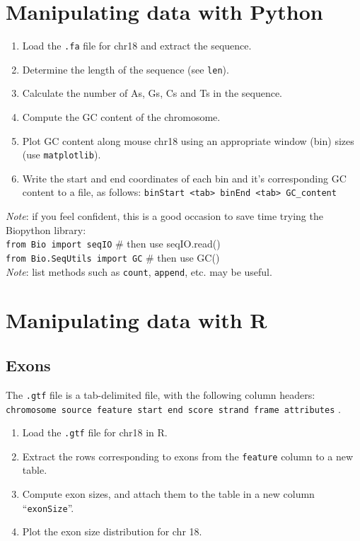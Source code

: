 \documentclass[a4paper,11pt]{article}
\begin{document}
\section{Manipulating data with Python}
\begin{enumerate}
\item Load the \texttt{.fa} file for chr18 and extract the sequence.
\item Determine the length of the sequence (see \texttt{len}).
\item Calculate the number of As, Gs, Cs and Ts in the sequence.
\item Compute the GC content of the chromosome.
\item Plot GC content along mouse chr18 using an appropriate window (bin) sizes (use \texttt{matplotlib}).
\item Write the start and end coordinates of each bin and it's corresponding GC content to a file, as follows: 
\texttt {binStart <tab> binEnd <tab> GC\_content}
\end{enumerate}
\textit{Note}: if you feel confident, this is a good occasion to save time trying the Biopython library: \\
\texttt{from Bio import seqIO} \# then use seqIO.read()\\
\texttt{from Bio.SeqUtils import GC} \# then use GC() \\
\textit{Note}: list methods such as \texttt{count}, \texttt{append}, etc. may be useful.



\section{Manipulating data with R}
\subsection{Exons}
The \texttt{.gtf} file is a tab-delimited file, with the following column headers: \\
\texttt {chromosome source feature start end score strand frame attributes} .
\begin{enumerate}
\item Load the \texttt{.gtf} file for chr18 in R.
\item Extract the rows corresponding to exons from the \texttt{feature} column to a new table.
\item Compute exon sizes, and attach them to the table in a new column ``\texttt{exonSize}''.
\item Plot the exon size distribution for chr 18.
\end{enumerate}
\end{document}
